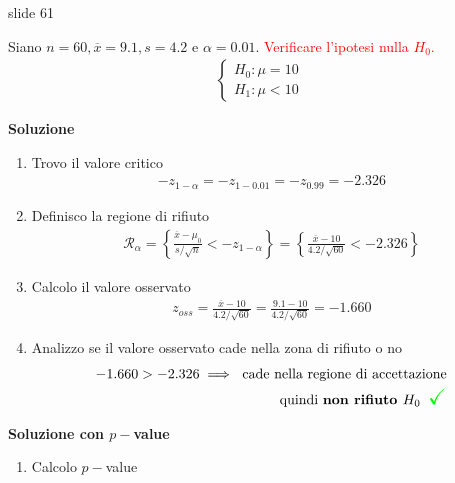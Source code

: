 \documentclass{article}  %
\theoremstyle{definition}
\begin{document}
\begin{esercizio}
	slide 61
\end{esercizio}

\begin{esercizio}
	Siano $n=60, \overline{x}=9.1, s=4.2$ e $\alpha=0.01$. \textcolor{red}{Verificare l'ipotesi nulla $H_0$.}
	\begin{align*}
		\begin{cases}
			H_0: \mu = 10\\
			H_1: \mu < 10
		\end{cases}
	\end{align*}
	\begin{center}
		\textbf{Soluzione}
	\end{center}
	\begin{enumerate}
		\item Trovo il valore critico
		\begin{align*}
			-z_{1-\alpha} = -z_{1-0.01}=-z_{0.99}=-2.326
		\end{align*}
		\item Definisco la regione di rifiuto
		\begin{align*}
			 \mathcal{R}_{\alpha}=\left\{\frac{\overline{x}-\mu_0}{s/\sqrt{n}} < -z_{1-\alpha}\right\} = \left\{\frac{\overline{x}-10}{4.2/ \sqrt{60}} < -2.326 \right\} 
		\end{align*}
		\item Calcolo il valore osservato
		\begin{align*}
			z_{oss}= \frac{\overline{x}-10}{4.2/ \sqrt{60}} = \frac{9.1-10}{4.2/ \sqrt{60}} = -1.660
		\end{align*}
		\item Analizzo se il valore osservato cade nella zona di rifiuto o no
		\begin{align*}
			 -1.660 > -2.326 \implies \text{ cade nella regione di accettazione} \\ \text{quindi \textbf{non rifiuto $H_0$}} \textcolor{green}{\scalebox{1.6}{ \checkmark}}
		\end{align*}
	\end{enumerate}
	\begin{center}
		\textbf{Soluzione con $p-$value}
	\end{center}
	\begin{enumerate}
		\item Calcolo $p-$value

\end{enumerate}
\end{esercizio}
\end{document}
